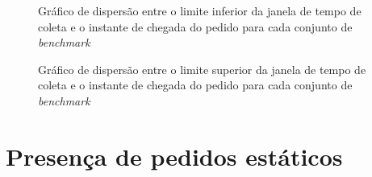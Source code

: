 
\begin{figure}[h]
    \centering
    \caption{Gráfico de dispersão entre o limite inferior da janela de tempo
             de coleta e o instante de chegada do pedido para cada conjunto 
             de \textit{benchmark}}
    \label{fig:scatterplot_pickup_lower_tw_x_arrival_time}
\end{figure}

\begin{figure}[h]
    \centering
    \caption{Gráfico de dispersão entre o limite superior da janela de tempo 
             de coleta e o instante de chegada do pedido para cada conjunto 
             de \textit{benchmark}}
    \label{fig:scatterplot_pickup_upper_tw_x_arrival_time}
\end{figure}






\section{Presença de pedidos estáticos}

